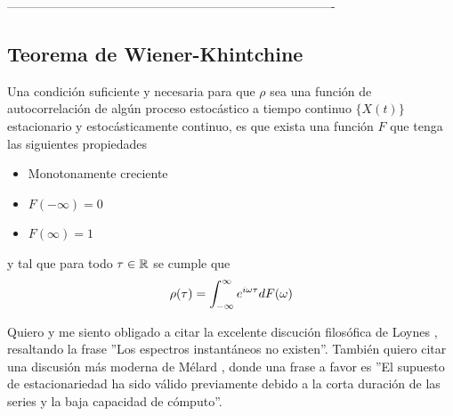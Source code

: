 -------------------------------------------------------------------------------

\subsection{Teorema de Wiener-Khintchine}

\begin{thrm}
Una condici\'on suficiente y necesaria para que $\rho$ sea una funci\'on de autocorrelaci\'on de 
alg\'un proceso estoc\'astico a tiempo continuo $\{X(t)\}$ estacionario y estoc\'asticamente 
continuo, es que exista una funci\'on $F$ que tenga las 
siguientes propiedades
\begin{itemize}
\item Monotonamente creciente
\item $F(-\infty) = 0$
\item $F(\infty) = 1$
\end{itemize}
y tal que para todo $\tau \in \mathbb{R}$ se cumple que
\begin{equation*}
\rho(\tau) = \int_{-\infty}^{\infty} e^{i \omega \tau} dF(\omega)
\end{equation*}
\end{thrm}


%


Quiero y me siento obligado a citar la excelente discuci\'on
filos\'ofica
de Loynes \cite{Loynes68}, resaltando la frase ''Los espectros instant\'aneos no existen''.
Tambi\'en quiero citar una discusi\'on m\'as moderna de M\'elard \cite{Melard89}, donde una
frase a favor es ''El supuesto de estacionariedad ha sido v\'alido previamente debido a la corta
duraci\'on de las series y la baja capacidad de c\'omputo''.


